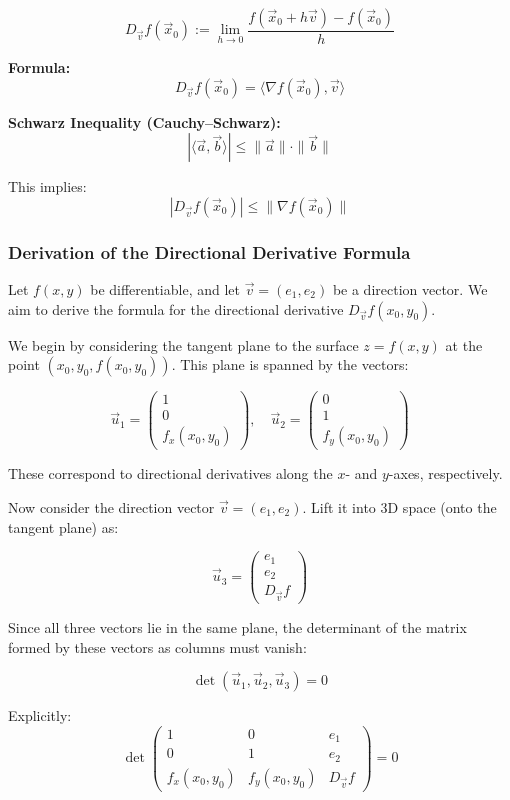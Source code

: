 \[
D_{\vec{v}}f(\vec{x}_0) := \lim_{h \to 0} \frac{f(\vec{x}_0 + h\vec{v}) - f(\vec{x}_0)}{h}
\]

\textbf{Formula:}
\[
D_{\vec{v}}f(\vec{x}_0) = \langle \nabla f(\vec{x}_0), \vec{v} \rangle
\]

\textbf{Schwarz Inequality (Cauchy–Schwarz):}
\[
|\langle \vec{a}, \vec{b} \rangle| \le \|\vec{a}\| \cdot \|\vec{b}\|
\]

This implies:
\[
|D_{\vec{v}}f(\vec{x}_0)| \le \|\nabla f(\vec{x}_0)\|
\]

\subsubsection*{Derivation of the Directional Derivative Formula}

Let \( f(x, y) \) be differentiable, and let \( \vec{v} = (e_1, e_2) \) be a direction vector. We aim to derive the formula for the directional derivative \( D_{\vec{v}} f(x_0, y_0) \).

We begin by considering the tangent plane to the surface \( z = f(x, y) \) at the point \( (x_0, y_0, f(x_0, y_0)) \). This plane is spanned by the vectors:

\[
\vec{u}_1 = 
\begin{pmatrix}
1 \\
0 \\
f_x(x_0, y_0)
\end{pmatrix}, \quad
\vec{u}_2 = 
\begin{pmatrix}
0 \\
1 \\
f_y(x_0, y_0)
\end{pmatrix}
\]

These correspond to directional derivatives along the \( x \)- and \( y \)-axes, respectively.

Now consider the direction vector \( \vec{v} = (e_1, e_2) \). Lift it into 3D space (onto the tangent plane) as:

\[
\vec{u}_3 =
\begin{pmatrix}
e_1 \\
e_2 \\
D_{\vec{v}}f
\end{pmatrix}
\]

Since all three vectors lie in the same plane, the determinant of the matrix formed by these vectors as columns must vanish:

\[
\det(\vec{u}_1, \vec{u}_2, \vec{u}_3) = 0
\]

Explicitly:
\[
\det
\begin{pmatrix}
1 & 0 & e_1 \\
0 & 1 & e_2 \\
f_x(x_0, y_0) & f_y(x_0, y_0) & D_{\vec{v}}f
\end{pmatrix} = 0
\]

